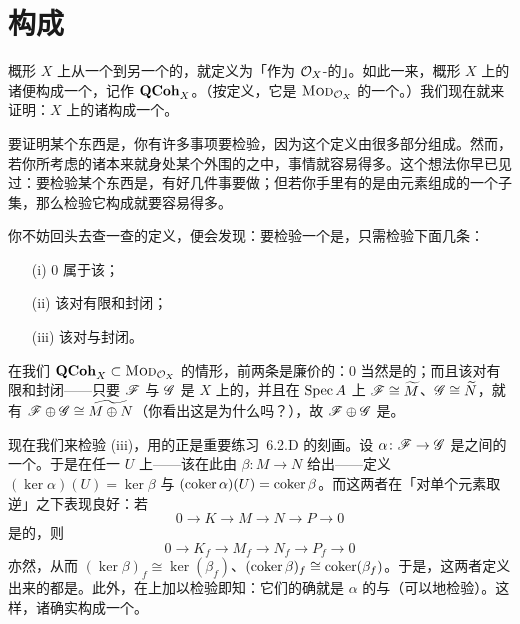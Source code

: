 
\section{\trQCSheaf{}构成\trAbelianCategory}

概形 $X$ 上从一个\trQCSheaf{}到另一个\trQCSheaf{}的\trMorphism，就定义为「作为 $\mathcal{O}_X$-\trModule{}的\trMorphism」。如此一来，概形 $X$ 上的诸\trQCSheaf{}便构成一个\trCategory，记作 $\mathbf{QCoh}_X$。（按定义，它是 $\textsc{Mod}_{\mathcal{O}_X}$ 的一个\trFullSubcategory。）我们现在就来证明：$X$ 上的诸\trQCSheaf{}构成一个\emph{\trAbelian}\trCategory。

要证明某个东西是\trAbelianCategory，你有许多事项要检验，因为这个定义由很多部分组成。然而，若你所考虑的诸\trObject{}本来就身处某个外围的\trAbelianCategory{}之中，事情就容易得多。这个想法你早已见过：要检验某个东西是\trGroup，有好几件事要做；但若你手里有的是由\trGroup{}元素组成的一个子集，那么检验它构成\trSubgroup{}就要容易得多。

你不妨回头去查一查\trAbelianCategory{}的定义，便会发现：要检验一个\trSubcategory{}是\trAbelian\trSubcategory，只需检验下面几条：
\begin{itemize}[leftmargin=2.6em,itemsep=2pt,topsep=3pt]
\item[(i)] $0$ 属于该\trSubcategory；
\item[(ii)] 该\trSubcategory{}对有限和封闭；
\item[(iii)] 该\trSubcategory{}对\trKernel{}与\trCokernel{}封闭。
\end{itemize}

在我们 $\mathbf{QCoh}_X\subset\textsc{Mod}_{\mathcal{O}_X}$ 的情形，前两条是廉价的：$0$ 当然是\trQC{}的；而且该\trSubcategory{}对有限和封闭——只要 $\mathscr{F}$ 与 $\mathscr{G}$ 是 $X$ 上的\trSheaf，并且在 $\operatorname{Spec} A$ 上 $\mathscr{F}\cong\widetilde{M}$、$\mathscr{G}\cong\widetilde{N}$，就有 $\mathscr{F}\oplus\mathscr{G}\cong\widetilde{M\oplus N}$（你看出这是为什么吗？），故 $\mathscr{F}\oplus\mathscr{G}$ 是\trQCSheaf。

现在我们来检验 (iii)，用的正是重要练习~6.2.D 的刻画。设 $\alpha\colon\mathscr{F}\to\mathscr{G}$ 是\trQCSheaf{}之间的一个\trMorphism。于是在任一\trAffine\trOpenSet{} $U$ 上——该\trMorphism{}在此由 $\beta\colon M\to N$ 给出——定义 $(\ker\alpha)(U)=\ker\beta$ 与 $(\operatorname{coker}\alpha)(U)=\operatorname{coker}\beta$。而这两者在「对单个元素取逆」之下表现良好：若
\[
0\longrightarrow K\longrightarrow M\longrightarrow N\longrightarrow P\longrightarrow 0
\]
是\trExact{}的，则
\[
0\longrightarrow K_f\longrightarrow M_f\longrightarrow N_f\longrightarrow P_f\longrightarrow 0
\]
亦然，从而 $(\ker\beta)_f\cong\ker(\beta_f)$、$(\operatorname{coker}\beta)_f\cong\operatorname{coker}(\beta_f)$。于是，这两者定义出来的都是\trQCSheaf。此外，在\trStalk{}上加以检验即知：它们的确就是 $\alpha$ 的\trKernel{}与\trCokernel（\trExactness{}可以\trStalkLocal{}地检验）。这样，诸\trQCSheaf{}确实构成一个\trAbelianCategory。


